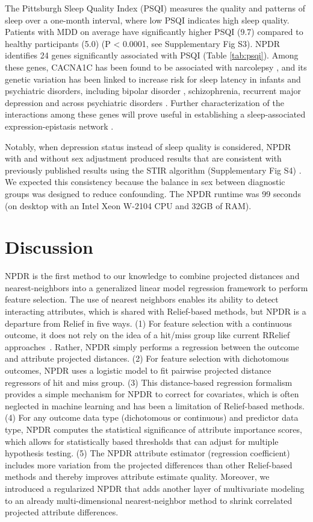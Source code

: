 \documentclass[10pt]{article}
\begin{document}
The Pittsburgh Sleep Quality Index (PSQI) measures the quality and patterns of sleep over a one-month interval, where low PSQI indicates high sleep quality.
Patients with MDD on average have significantly higher PSQI (9.7) compared to healthy participants (5.0) (P < 0.0001, see Supplementary Fig S3).
NPDR identifies 24 genes significantly associated with PSQI (Table \ref{tab:psqi}).
Among these genes, CACNA1C has been found to be associated with narcolepsy \cite{shimada2010}, and its genetic variation has been linked to increase risk for sleep latency in infants \cite{kantojarvi2017} and psychiatric disorders, including bipolar disorder \cite{franke2010}, schizophrenia, recurrent major depression \cite{green2009} and across psychiatric disorders \cite{crossdisorder2013, lotan2014}.
Further characterization of the interactions among these genes will prove useful in establishing a sleep-associated expression-epistasis network \cite{lareau15, mckinney2009capturing}.

Notably, when depression status instead of sleep quality is considered, NPDR with and without sex adjustment produced results that are consistent with previously published results using the STIR algorithm (Supplementary Fig S4) \cite{stir}.
We expected this consistency because the balance in sex between diagnostic groups was designed to reduce confounding.
The NPDR runtime was 99 seconds (on desktop with an Intel Xeon W-2104 CPU and 32GB of RAM).


\section{Discussion}
NPDR is the first method to our knowledge to combine projected distances and nearest-neighbors into a generalized linear model regression framework to perform feature selection.
The use of nearest neighbors enables its ability to detect interacting attributes, which is shared with Relief-based methods, but NPDR is a departure from Relief in five ways.
(1) For feature selection with a continuous outcome, it does not rely on the idea of a hit/miss group like current RRelief approaches~\cite{urbanowicz17}.
Rather, NPDR simply performs a regression between the outcome and attribute projected distances.
(2) For feature selection with dichotomous outcomes, NPDR uses a logistic model to fit pairwise projected distance regressors of hit and miss group.
(3) This distance-based regression formalism provides a simple mechanism for NPDR to correct for covariates, which is often neglected in machine learning and has been a limitation of Relief-based methods.
(4) For any outcome data type (dichotomous or continuous) and predictor data type, NPDR computes the statistical significance of attribute importance scores, which allows for statistically based thresholds that can adjust for multiple hypothesis testing.
(5) The NPDR attribute estimator (regression coefficient) includes more variation from the projected differences than other Relief-based methods and thereby improves attribute estimate quality.
Moreover, we introduced a regularized NPDR that adds another layer of multivariate modeling to an already multi-dimensional nearest-neighbor method to shrink correlated projected attribute differences.  
\end{document}
